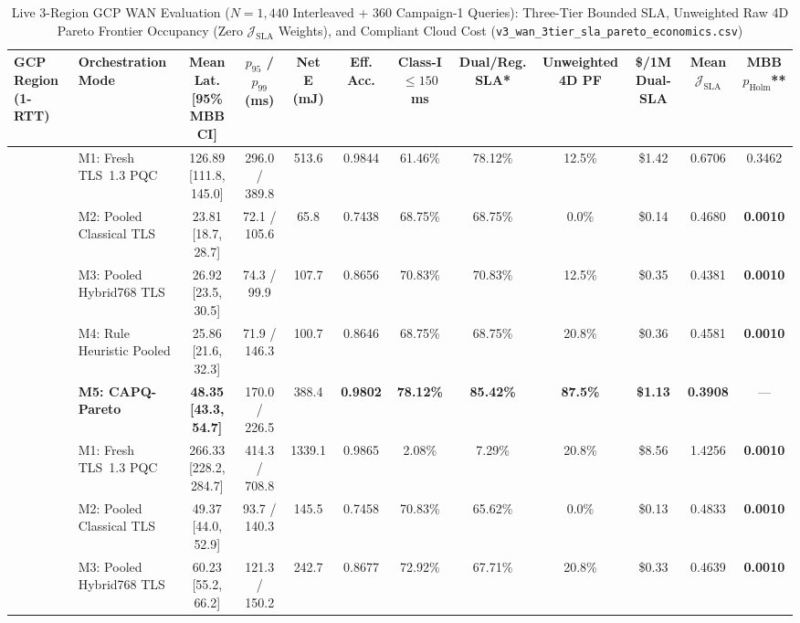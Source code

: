 \documentclass[10pt,journal,compsoc]{IEEEtran}
\begin{document}
\begin{table}[!t]
\centering
\caption{Live 3-Region GCP WAN Evaluation ($N=1,440$ Interleaved + $360$ Campaign-1 Queries): Three-Tier Bounded SLA, Unweighted Raw 4D Pareto Frontier Occupancy (Zero $\mathcal{J}_{\mathrm{SLA}}$ Weights), and Compliant Cloud Cost (\texttt{v3\_wan\_3tier\_sla\_pareto\_economics.csv})}
\label{tab:wan}
\setlength{\tabcolsep}{3.1pt}
\scriptsize
\begin{tabular}{@{}llcccccccccc@{}}
\toprule
GCP Region (1-RTT) & Orchestration Mode & Mean Lat. [95\% MBB CI] & $p_{95}$ / $p_{99}$ (ms) & Net E (mJ) & Eff. Acc. & Class-I $\le\!150$ms & Dual/Reg. SLA* & \textbf{Unweighted 4D PF} & \textbf{\$/1M Dual-SLA} & Mean $\mathcal{J}_{\mathrm{SLA}}$ & MBB $p_{\mathrm{Holm}}$** \\
\midrule
{}
 & M1: Fresh TLS~1.3 PQC        & 126.89 [111.8, 145.0] & 296.0 / 389.8 & 513.6 & 0.9844 & 61.46\% & 78.12\% & 12.5\% & \$1.42 & 0.6706 & 0.3462 \\
 & M2: Pooled Classical TLS     & 23.81 [18.7, 28.7]    & 72.1 / 105.6  & 65.8  & 0.7438 & 68.75\% & 68.75\% & 0.0\% & \$0.14 & 0.4680 & \textbf{0.0010} \\
 & M3: Pooled Hybrid768 TLS     & 26.92 [23.5, 30.5]    & 74.3 / 99.9   & 107.7 & 0.8656 & 70.83\% & 70.83\% & 12.5\% & \$0.35 & 0.4381 & \textbf{0.0010} \\
 & M4: Rule Heuristic Pooled    & 25.86 [21.6, 32.3]    & 71.9 / 146.3  & 100.7 & 0.8646 & 68.75\% & 68.75\% & 20.8\% & \$0.36 & 0.4581 & \textbf{0.0010} \\
 & \textbf{M5: CAPQ-Pareto}     & \textbf{48.35 [43.3, 54.7]} & 170.0 / 226.5 & 388.4 & \textbf{0.9802} & \textbf{78.12\%} & \textbf{85.42\%} & \textbf{87.5\%} & \textbf{\$1.13} & \textbf{0.3908} & --- \\
\midrule
{}
 & M1: Fresh TLS~1.3 PQC        & 266.33 [228.2, 284.7] & 414.3 / 708.8 & 1339.1& 0.9865 & 2.08\%  & 7.29\%  & 20.8\% & \$8.56 & 1.4256 & \textbf{0.0010} \\
 & M2: Pooled Classical TLS     & 49.37 [44.0, 52.9]    & 93.7 / 140.3  & 145.5 & 0.7458 & 70.83\% & 65.62\% & 0.0\% & \$0.13 & 0.4833 & \textbf{0.0010} \\
 & M3: Pooled Hybrid768 TLS     & 60.23 [55.2, 66.2]    & 121.3 / 150.2 & 242.7 & 0.8677 & 72.92\% & 67.71\% & 20.8\% & \$0.33 & 0.4639 & \textbf{0.0010} \\

\end{tabular}
\end{table}
\end{document}
